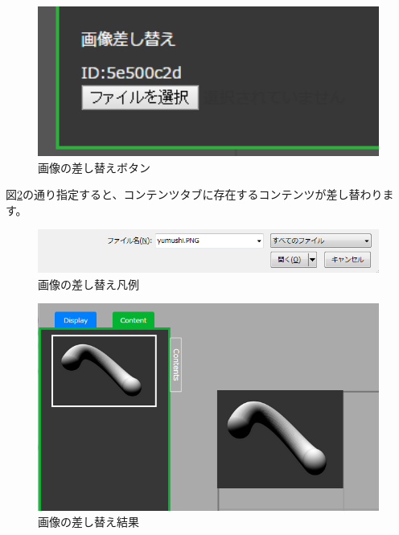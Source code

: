 \documentclass[a4paper,10pt,oneside]{jsbook}
\begin{document}
\begin{figure}[htbp]
	\begin{center}
		\includegraphics[width=11.5cm]{image/SASHI.PNG}
	\end{center}
	\caption{画像の差し替えボタン}
	\label{fig:replaceimagebutton}
\end{figure}

図\ref{fig:replaceimage}の通り指定すると、コンテンツタブに存在するコンテンツが差し替わります。\\

\begin{figure}[htbp]
	\begin{center}
		\includegraphics[width=11.5cm]{image/YUMUSHI.PNG}
	\end{center}
	\caption{画像の差し替え凡例}
	\label{fig:replaceimage}
\end{figure}


\begin{figure}[htbp]
	\begin{center}
		\includegraphics[width=11.5cm]{image/SASHI2.PNG}
	\end{center}
	\caption{画像の差し替え結果}
	\label{fig:replaceimageresult}
\end{figure}
\end{document}
